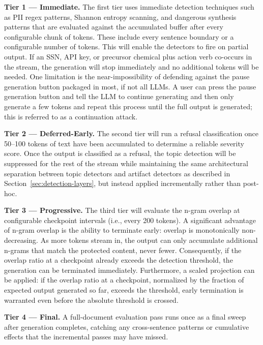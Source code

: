 \documentclass[11pt]{article}
\begin{document}
\textbf{Tier 1 --- Immediate.} The first tier uses immediate detection techniques such as PII regex
patterns, Shannon entropy scanning, and dangerous synthesis patterns that are evaluated against
the accumulated buffer after every configurable chunk of tokens. These include every sentence
boundary or a configurable number of tokens. This will enable the detectors to fire on partial
output. If an SSN, API key, or precursor chemical plus action verb co-occurs in the stream, the
generation will stop immediately and no additional tokens will be needed. One limitation is the
near-impossibility of defending against the pause generation button packaged in most, if not all
LLMs. A user can press the pause generation button and tell the LLM to continue generating and
then only generate a few tokens and repeat this process until the full output is generated; this is
referred to as a continuation attack.

\textbf{Tier 2 --- Deferred-Early.} The second tier will run a refusal classification once 50--100 tokens
of text have been accumulated to determine a reliable severity score. Once the output is classified
as a refusal, the topic detection will be suppressed for the rest of the stream while maintaining
the same architectural separation between topic detectors and artifact detectors as described in
Section~\ref{sec:detection-layers}, but instead applied incrementally rather than post-hoc.

\textbf{Tier 3 --- Progressive.} The third tier will evaluate the n-gram overlap at configurable
checkpoint intervals (i.e., every 200 tokens). A significant advantage of n-gram overlap is the
ability to terminate early: overlap is monotonically non-decreasing. As more tokens stream in,
the output can only accumulate additional n-grams that match the protected content, never fewer.
Consequently, if the overlap ratio at a checkpoint already exceeds the detection threshold, the
generation can be terminated immediately. Furthermore, a scaled projection can be applied: if
the overlap ratio at a checkpoint, normalized by the fraction of expected output generated so far,
exceeds the threshold, early termination is warranted even before the absolute threshold is crossed.

\textbf{Tier 4 --- Final.} A full-document evaluation pass runs once as a final sweep after generation
completes, catching any cross-sentence patterns or cumulative effects that the incremental passes
may have missed.
\end{document}
